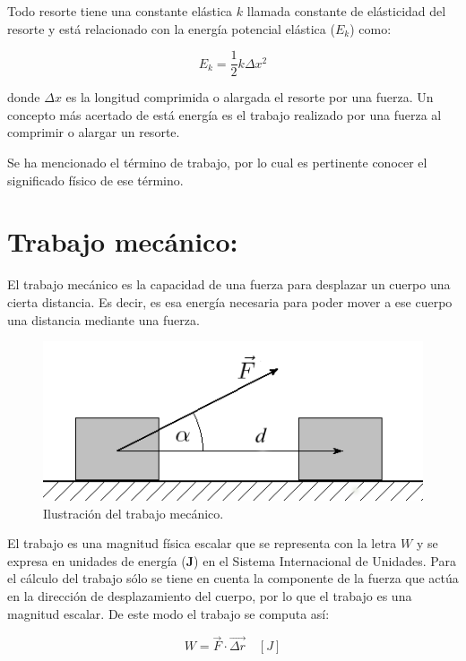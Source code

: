 Todo resorte tiene una constante elástica $k$ llamada constante de elásticidad del resorte y está relacionado con la energía 
potencial elástica ($E_k$) como:

\begin{equation}
E_k = \frac{1}{2}k\Delta x^2
\end{equation}

donde $\Delta x$ es la longitud comprimida o alargada el resorte por una fuerza. Un concepto más acertado de está energía es el 
trabajo realizado por una fuerza al comprimir o alargar un resorte.

Se ha mencionado el término de trabajo, por lo cual es pertinente conocer el significado físico de ese término.

\section{Trabajo mecánico:}

El trabajo mecánico es la capacidad de una fuerza para desplazar un cuerpo una cierta distancia. Es decir, es esa energía 
necesaria para poder mover a ese cuerpo una distancia mediante una fuerza.\\

\begin{figure}[ht]
 \centering
 \includegraphics[scale=0.5]{images/trabajo.png}
 \caption{Ilustración del trabajo mecánico.}\label{tmec}
\end{figure}

El trabajo es una magnitud física escalar que se representa con la letra $W$ y se expresa en unidades de energía (\textbf{J}) en 
el Sistema Internacional de Unidades. Para el cálculo del trabajo sólo se tiene en cuenta la componente de la fuerza que actúa en 
la dirección de desplazamiento del cuerpo, por lo que el trabajo es una magnitud escalar. De este modo el trabajo se computa así:

\begin{equation}
W = \vec{F}\cdot\vec{\Delta r}\quad [J]
\end{equation}

